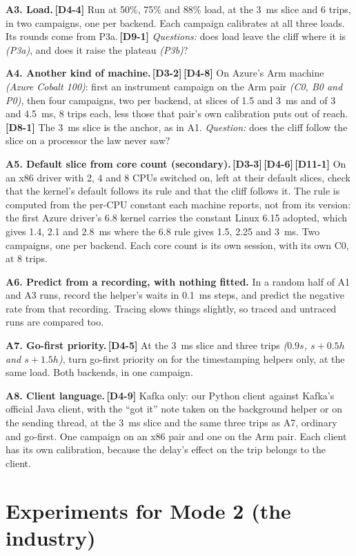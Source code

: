 \documentclass[11pt]{article}
\newcommand{\gl}[1]{{\color{soft}\itshape\small (#1)}}
\newcommand{\chg}[1]{\,{\color{chgcol}\bfseries\footnotesize[#1]}}
\newcommand{\chgold}[1]{\,{\color{oldcol}\bfseries\footnotesize[#1]}}
\begin{document}
\textbf{A3. Load.}\chgold{D4-4} Run at 50\%, 75\% and 88\% load, at the 3~ms slice and 6 trips, in two campaigns, one per backend. Each campaign calibrates at all three loads. Its rounds come from P3a.\chg{D9-1} \emph{Questions:} does load leave the cliff where it is \gl{P3a}, and does it raise the plateau \gl{P3b}?

\textbf{A4. Another kind of machine.}\chgold{D3-2}\chgold{D4-8} On Azure's Arm machine \gl{Azure Cobalt 100}: first an instrument campaign on the Arm pair \gl{C0, B0 and P0}, then four campaigns, two per backend, at slices of 1.5 and 3~ms and of 3 and 4.5~ms, 8 trips each, less those that pair's own calibration puts out of reach.\chg{D8-1} The 3~ms slice is the anchor, as in A1. \emph{Question:} does the cliff follow the slice on a processor the law never saw?

\textbf{A5. Default slice from core count (secondary).}\chgold{D3-3}\chgold{D4-6}\chg{D11-1} On an x86 driver with 2, 4 and 8 CPUs switched on, left at their default slices, check that the kernel's default follows its rule and that the cliff follows it. The rule is computed from the per-CPU constant each machine reports, not from its version: the first Azure driver's 6.8 kernel carries the constant Linux 6.15 adopted, which gives 1.4, 2.1 and 2.8~ms where the 6.8 rule gives 1.5, 2.25 and 3~ms. Two campaigns, one per backend. Each core count is its own session, with its own C0, at 8 trips.

\textbf{A6. Predict from a recording, with nothing fitted.} In a random half of A1 and A3 runs, record the helper's waits in 0.1~ms steps, and predict the negative rate from that recording. Tracing slows things slightly, so traced and untraced runs are compared too.

\textbf{A7. Go-first priority.}\chgold{D4-5} At the 3~ms slice and three trips \gl{$0.9s$, $s + 0.5h$ and $s + 1.5h$}, turn go-first priority on for the timestamping helpers only, at the same load. Both backends, in one campaign.

\textbf{A8. Client language.}\chgold{D4-9} Kafka only: our Python client against Kafka's official Java client, with the ``got it'' note taken on the background helper or on the sending thread, at the 3~ms slice and the same three trips as A7, ordinary and go-first. One campaign on an x86 pair and one on the Arm pair. Each client has its own calibration, because the delay's effect on the trip belongs to the client.

\section{Experiments for Mode 2 (the industry)}
\end{document}
